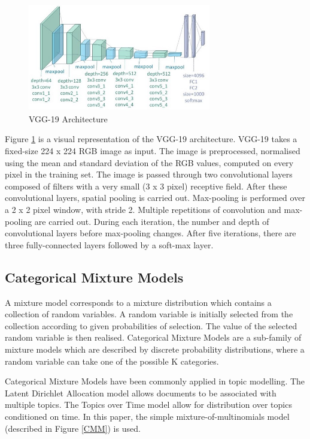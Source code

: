 \documentclass{article}
\begin{document}
\begin{figure}[h]
  \centering
  \includegraphics[width=8cm]{vgg19.png}
  \caption{VGG-19 Architecture \cite{vgg19img}}
  \label{vgg_architecture}
\end{figure}

Figure \ref{vgg_architecture} is a visual representation of the VGG-19 architecture. VGG-19 takes a fixed-size 224 x 224 RGB image as input. The image is preprocessed, normalised using the mean and standard deviation of the RGB values, computed on every pixel in the training set. The image is passed through two convolutional layers composed of filters with a very small (3 x 3 pixel) receptive field. After these convolutional layers, spatial pooling is carried out. Max-pooling is performed over a 2 x 2 pixel window, with stride 2. Multiple repetitions of convolution and max-pooling are carried out. During each iteration, the number and depth of convolutional layers before max-pooling changes. After five iterations, there are three fully-connected layers followed by a soft-max layer. 

\subsection{Categorical Mixture Models}
A mixture model corresponds to a mixture distribution which contains a collection of random variables. A random variable is initially selected from the collection according to given probabilities of selection. The value of the selected random variable is then realised. Categorical Mixture Models are a sub-family of mixture models which are described by discrete probability distributions, where a random variable can take one of the possible K categories.   

Categorical Mixture Models have been commonly applied in topic modelling. The Latent Dirichlet Allocation \cite{LDA} model allows documents to be associated with multiple topics. The Topics over Time \cite{ToT} model allow for distribution over topics conditioned on time. In this paper, the simple mixture-of-multinomials model (described in Figure \ref{CMM}) is used.  
\end{document}
